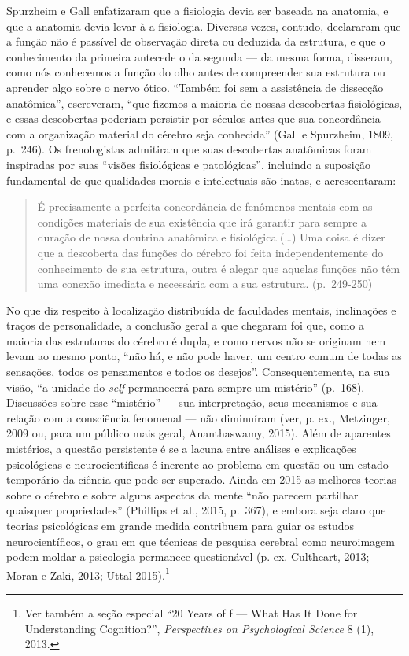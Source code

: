 Spurzheim e Gall enfatizaram que a fisiologia devia ser baseada na
anatomia, e que a anatomia devia levar à a fisiologia. Diversas vezes,
contudo, declararam que a função não é passível de observação direta ou
deduzida da estrutura, e que o conhecimento da primeira antecede o da
segunda --- da mesma forma, disseram, como nós conhecemos a função do
olho antes de compreender sua estrutura ou aprender algo sobre o nervo
ótico. ``Também foi sem a assistência de dissecção anatômica'',
escreveram, ``que fizemos a maioria de nossas descobertas fisiológicas,
e essas descobertas poderiam persistir por séculos antes que sua
concordância com a organização material do cérebro seja conhecida''
(Gall e Spurzheim, 1809, p.~246). Os frenologistas admitiram que suas
descobertas anatômicas foram inspiradas por suas ``visões fisiológicas e
patológicas'', incluindo a suposição fundamental de que qualidades
morais e intelectuais são inatas, e acrescentaram:

\begin{quote}
É precisamente a perfeita concordância de fenômenos mentais com as
condições materiais de sua existência que irá garantir para sempre a
duração de nossa doutrina anatômica e fisiológica (\ldots{}) Uma coisa é
dizer que a descoberta das funções do cérebro foi feita
independentemente do conhecimento de sua estrutura, outra é alegar que
aquelas funções não têm uma conexão imediata e necessária com a sua
estrutura. (p.~249-250)
\end{quote}

No que diz respeito à localização distribuída de faculdades mentais,
inclinações e traços de personalidade, a conclusão geral a que chegaram
foi que, como a maioria das estruturas do cérebro é dupla, e como nervos
não se originam nem levam ao mesmo ponto, ``não há, e não pode haver, um
centro comum de todas as sensações, todos os pensamentos e todos os
desejos''. Consequentemente, na sua visão, ``a unidade do \emph{self}
permanecerá para sempre um mistério'' (p.~168). Discussões sobre esse
``mistério'' --- sua interpretação, seus mecanismos e sua relação com a
consciência fenomenal --- não diminuíram (ver, p. ex., Metzinger, 2009 ou,
para um público mais geral, Ananthaswamy, 2015). Além de aparentes
mistérios, a questão persistente é se a lacuna entre análises e
explicações psicológicas e neurocientíficas é inerente ao problema em
questão ou um estado temporário da ciência que pode ser superado. Ainda
em 2015 as melhores teorias sobre o cérebro e sobre alguns aspectos da
mente ``não parecem partilhar quaisquer propriedades'' (Phillips et al.,
2015, p.~367), e embora seja claro que teorias psicológicas em grande
medida contribuem para guiar os estudos neurocientíficos, o grau em que
técnicas de pesquisa cerebral como neuroimagem podem moldar a psicologia
permanece questionável (p. ex. Cultheart, 2013; Moran e Zaki, 2013; Uttal
2015).\footnote[10]{Ver também a seção especial ``20 Years of f --- What Has It
Done for Understanding Cognition?'', \emph{Perspectives on Psychological
Science} 8 (1), 2013.}

